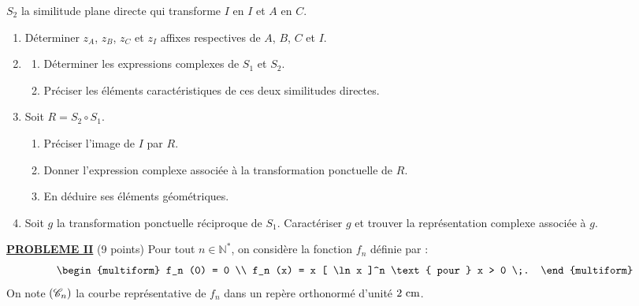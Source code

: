 \begin{description}
                         $S_2$ la similitude plane directe qui transforme $I$ en $I$ et $A$ en $C$.
                  \begin{enumerate}
                        \item D\'eterminer $z_A$, $z_B$, $z_C$ et $z_I$ affixes respectives de $A$, $B$, $C$ et $I$.
                        \item \begin{enumerate}
                                    \item D\'eterminer les expressions complexes de $S_1$ et $S_2$.
                                    \item Pr\'eciser les \'el\'ements caract\'eristiques de ces deux similitudes directes.
                              \end{enumerate}
                        \item Soit $R = S_2 \circ S_1$.
                              \begin{enumerate}
                                    \item Pr\'eciser l'image de $I$ par $R$.
                                    \item Donner l'expression complexe associ\'ee \`a la transformation ponctuelle de $R$.
                                    \item En d\'eduire ses \'el\'ements g\'eom\'etriques.
                              \end{enumerate}
                        \item Soit $g$ la transformation ponctuelle r\'eciproque de $S_1$.
                              Caract\'eriser $g$ et trouver la repr\'esentation complexe associ\'ee \`a $g$.
                  \end{enumerate}
      \end{description}
\noindent \underline{\textsc{\textbf{PROBLEME II}}} (9 points) \newline
      Pour tout $n \in \mathbb{N}^*$, on consid\`ere la fonction $f_n$ d\'efinie par :
      \[
            \begin{multiform}
                  f_n (0) = 0 \\
                  f_n (x) = x [ \ln x ]^n \text{ pour } x > 0 \;.
            \end{multiform}
      \]
      On note $(\mathscr{C}_n)$ la courbe repr\'esentative de $f_n$ dans un rep\`ere orthonorm\'e \Oij{} d'unit\'e $2~\mathrm{cm}$.
